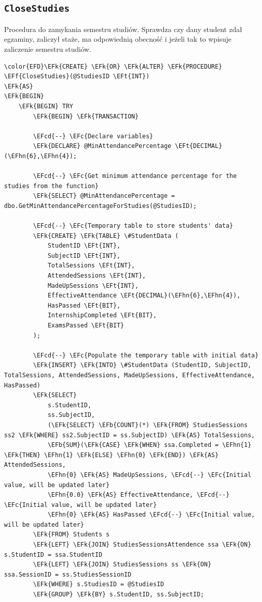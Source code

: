\documentclass[11pt]{article}
\newcommand{\EFc}[1]{\textcolor{EFc}{\textit{#1}}} %
\newcommand{\EFcd}[1]{\textcolor{EFcd}{\textit{#1}}} %
\newcommand{\EFk}[1]{\textcolor{EFk}{\textbf{#1}}} %
\newcommand{\EFb}[1]{\textcolor{EFb}{\textbf{#1}}} %
\newcommand{\EFf}[1]{\textcolor{EFf}{#1}} %
\newcommand{\EFt}[1]{\textcolor{EFt}{\textbf{#1}}} %
\newcommand{\EFhn}[1]{\textcolor{EFhn}{#1}} %
\begin{document}
\subsection{\texttt{CloseStudies}}
\label{sec:orge4cee6c}
Procedura do zamykania semestru studiów. Sprawdza czy dany student zdał egzaminy, zaliczył staże, ma odpowiednią obecność i jeżeli tak to wpisuje zaliczenie semestru studiów.
\begin{Code}
\begin{Verbatim}
\color{EFD}\EFk{CREATE} \EFk{OR} \EFk{ALTER} \EFk{PROCEDURE} \EFf{CloseStudies}(@StudiesID \EFt{INT})
\EFk{AS}
\EFk{BEGIN}
    \EFk{BEGIN} TRY
        \EFk{BEGIN} \EFk{TRANSACTION}

        \EFcd{--} \EFc{Declare variables}
        \EFk{DECLARE} @MinAttendancePercentage \EFt{DECIMAL}(\EFhn{6},\EFhn{4});

        \EFcd{--} \EFc{Get minimum attendance percentage for the studies from the function}
        \EFk{SELECT} @MinAttendancePercentage = dbo.GetMinAttendancePercentageForStudies(@StudiesID);

        \EFcd{--} \EFc{Temporary table to store students' data}
        \EFk{CREATE} \EFk{TABLE} \#StudentData (
            StudentID \EFt{INT},
            SubjectID \EFt{INT},
            TotalSessions \EFt{INT},
            AttendedSessions \EFt{INT},
            MadeUpSessions \EFt{INT},
            EffectiveAttendance \EFt{DECIMAL}(\EFhn{6},\EFhn{4}),
            HasPassed \EFt{BIT},
            InternshipCompleted \EFt{BIT},
            ExamsPassed \EFt{BIT}
        );

        \EFcd{--} \EFc{Populate the temporary table with initial data}
        \EFk{INSERT} \EFk{INTO} \#StudentData (StudentID, SubjectID, TotalSessions, AttendedSessions, MadeUpSessions, EffectiveAttendance, HasPassed)
        \EFk{SELECT}
            s.StudentID,
            ss.SubjectID,
            (\EFk{SELECT} \EFb{COUNT}(*) \EFk{FROM} StudiesSessions ss2 \EFk{WHERE} ss2.SubjectID = ss.SubjectID) \EFk{AS} TotalSessions,
            \EFb{SUM}(\EFk{CASE} \EFk{WHEN} ssa.Completed = \EFhn{1} \EFk{THEN} \EFhn{1} \EFk{ELSE} \EFhn{0} \EFk{END}) \EFk{AS} AttendedSessions,
            \EFhn{0} \EFk{AS} MadeUpSessions, \EFcd{--} \EFc{Initial value, will be updated later}
            \EFhn{0.0} \EFk{AS} EffectiveAttendance, \EFcd{--} \EFc{Initial value, will be updated later}
            \EFhn{0} \EFk{AS} HasPassed \EFcd{--} \EFc{Initial value, will be updated later}
        \EFk{FROM} Students s
        \EFk{LEFT} \EFk{JOIN} StudiesSessionsAttendence ssa \EFk{ON} s.StudentID = ssa.StudentID
        \EFk{LEFT} \EFk{JOIN} StudiesSessions ss \EFk{ON} ssa.SessionID = ss.StudiesSessionID
        \EFk{WHERE} s.StudiesID = @StudiesID
        \EFk{GROUP} \EFk{BY} s.StudentID, ss.SubjectID;



\end{Verbatim}
\end{Code}
\end{document}
